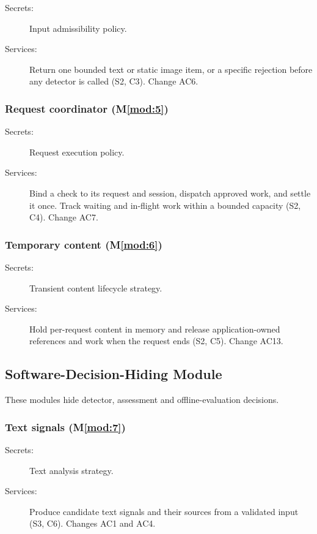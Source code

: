 \documentclass[12pt, titlepage]{article}
\newcommand{\mref}[1]{M\ref{#1}}
\newcommand{\modref}[1]{\mref{mod:#1}}
\begin{document}
\begin{description}
\item[Secrets:] Input admissibility policy.
\item[Services:] Return one bounded text or static image item, or a specific rejection before any detector is called (S2, C3). Change AC6.
\end{description}

\subsubsection{Request coordinator (\modref{5})}

\begin{description}
\item[Secrets:] Request execution policy.
\item[Services:] Bind a check to its request and session, dispatch approved work, and settle it once. Track waiting and in-flight work within a bounded capacity (S2, C4). Change AC7.
\end{description}

\subsubsection{Temporary content (\modref{6})}

\begin{description}
\item[Secrets:] Transient content lifecycle strategy.
\item[Services:] Hold per-request content in memory and release application-owned references and work when the request ends (S2, C5). Change AC13.
\end{description}

\subsection{Software-Decision-Hiding Module}

These modules hide detector, assessment and offline-evaluation decisions.

\subsubsection{Text signals (\modref{7})}

\begin{description}
\item[Secrets:] Text analysis strategy.
\item[Services:] Produce candidate text signals and their sources from a validated input (S3, C6). Changes AC1 and AC4.
\end{description}
\end{document}
